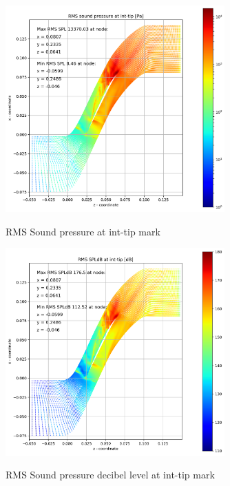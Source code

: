 \begin{figure}[ht]
  \centering
  \includegraphics[width=0.75\textwidth]{Figures/int-tip-rms-spl.png} \label{int-tip-rms-spl}
  \caption{RMS Sound pressure at int-tip mark}
  
  \vspace*{\floatsep}%

  \includegraphics[width=0.75\textwidth]{Figures/int-tip-rms-spldb.png} \label{int-tip-rms-spldb}
  \caption{RMS Sound pressure decibel level at int-tip mark}
\end{figure}
